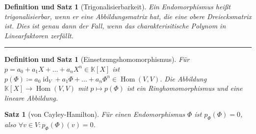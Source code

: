 \documentclass[a4paper]{article}
\newcounter{Sec}
\theoremstyle{marginbreak}
\newtheorem{satz}[definition]{Satz}
\newtheorem{defsatz}[definition]{Definition und Satz}
\DeclareMathOperator{\Hom}{Hom}
\DeclareMathOperator{\id}{id}
\newcommand{\sep}{%
	\rule{\textwidth}{0.3pt}%
	\stepcounter{Sec}%
	}
\begin{document}
	\begin{defsatz}[Trigonalisierbarkeit]
		Ein Endomorphismus heißt trigonalisierbar, wenn er eine Abbildungsmatrix hat,
		die eine obere Dreiecksmatrix ist. Dies ist genau dann der Fall, wenn das
		charakterisitische Polynom in Linearfaktoren zerfällt.
	\end{defsatz}
	\sep
	\begin{defsatz}[Einsetzungshomomorphismus]
		Für $p = a_0 + a_1X + \ldots + a_nX^n \in\mathbb{K}[X]$ ist $p(\Phi)\coloneqq a_0\id_V+a_1\Phi+\ldots+a_n\Phi^n \in\Hom(V, V)$.
		Die Abbildung $\mathbb{K}[X]\to\Hom(V, V)$ mit $p\mapsto p(\Phi)$ ist ein Ringhomomorphismus und eine lineare Abbildung.
	\end{defsatz}
	\begin{satz}[von Cayley-Hamilton]
		Für einen Endomorphismus $\Phi$ ist $p_\Phi(\Phi) = 0$, also $\forall v\in V: p_\Phi(\Phi)(v) = 0$.
	\end{satz}
\end{document}
